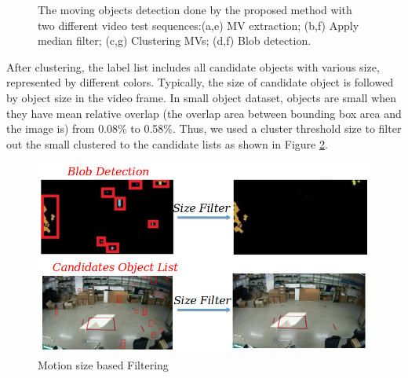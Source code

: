 \begin{figure}
{}
\caption{The moving objects detection done by the proposed method with two different video test sequences:(a,e) MV extraction; (b,f) Apply median filter; (c,g) Clustering MVs; (d,f) Blob detection.}
\label{fig:mvanalysis}
\end{figure}
After clustering, the label list includes all candidate objects with various size, represented by different colors. Typically, the size of candidate object is followed by object size in the video frame. In small object dataset, objects are small when they have mean relative overlap (the overlap area between bounding box area and the image is) from 0.08\% to 0.58\%. Thus, we used a cluster threshold size to filter out the small clustered to the candidate lists as shown in Figure \ref{fig:filter}.\\
\begin{figure}
\centering
 \includegraphics[width=1.0\linewidth]{Figures/filter.png}
 \caption{Motion size based Filtering}
 \label{fig:filter}
\end{figure}
